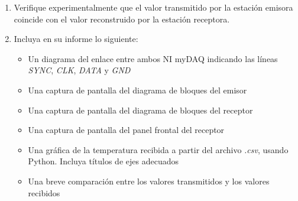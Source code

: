 \begin{enumerate}
\item Verifique experimentalmente que el valor transmitido por la estación emisora coincide con el valor reconstruido por la estación receptora.
\item Incluya en su informe lo siguiente:
    \begin{itemize}
        \item Un diagrama del enlace entre ambos NI myDAQ indicando las líneas \emph{SYNC}, \emph{CLK}, \emph{DATA} y \emph{GND}
        \item Una captura de pantalla del diagrama de bloques del emisor
        \item Una captura de pantalla del diagrama de bloques del receptor
        \item Una captura de pantalla del panel frontal del receptor
        \item Una gráfica de la temperatura recibida a partir del archivo \emph{.csv}, usando Python. Incluya títulos de ejes adecuados
        \item Una breve comparación entre los valores transmitidos y los valores recibidos
    \end{itemize}
\end{enumerate}
